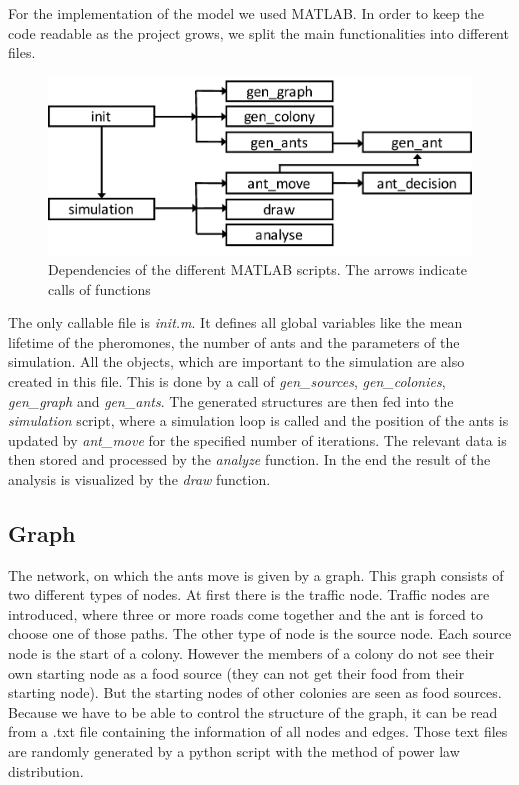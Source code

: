 For the implementation of the model we used MATLAB. In order to keep the code readable as the project grows, we split the main functionalities into different files.
\begin{figure}[H]
	\centering
	\includegraphics[scale=0.5]{Dependencies.pdf}
	\caption{Dependencies of the different MATLAB scripts. The arrows indicate calls of functions}
\end{figure}
The only callable file is \textit{init.m}. It defines all global variables like the mean lifetime of the pheromones, the number of ants and the parameters of the simulation. All the objects, which are important to the simulation are also created in this file. This is done by a call of \textit{gen\_sources}, \textit{gen\_colonies}, \textit{gen\_graph} and \textit{gen\_ants}. The generated structures are then fed into the \textit{simulation} script, where a simulation loop is called and the position of the ants is updated by \textit{ant\_move} for the specified number of iterations. The relevant data is then stored and processed by the \textit{analyze} function. In the end the result of the analysis is visualized by the \textit{draw} function.
\subsection{Graph}
The network, on which the ants move is given by a graph. This graph consists of two different types of nodes. At first there is the traffic node. Traffic nodes are introduced, where three or more roads come together and the ant is forced to choose one of those paths. The other type of node is the source node. Each source node is the start of a colony. However the members of a colony do not see their own starting node as a food source (they can not get their food from their starting node). But the starting nodes of other colonies are seen as food sources. Because we have to be able to control the structure of the graph, it can be read from a .txt file containing the information of all nodes and edges. Those text files are randomly generated by a python script with the method of power law distribution.
